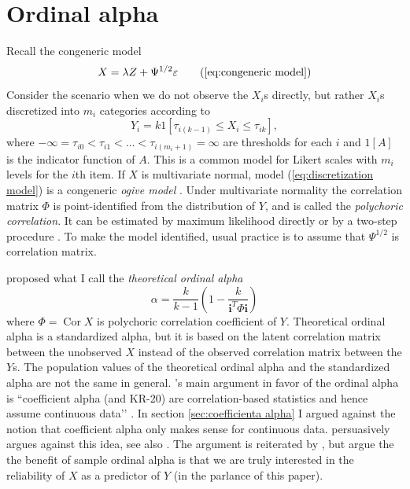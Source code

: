\documentclass[twoside]{article}
\DeclareMathOperator{\Cor}{Cor}
\begin{document}
\section{Ordinal alpha\label{sec:Ordinal alpha}}

Recall the congeneric model
\begin{equation}
X=\lambda Z+\Psi^{1/2}\varepsilon    \tag{\ref{eq:congeneric model}}
\end{equation}
Consider the scenario when we do not observe the $X_{i}$s directly,
but rather $X_{i}$s discretized into $m_{i}$ categories according
to
\begin{equation}
Y_{i}=k1[\tau_{i(k-1)}\leq X_{i}\leq\tau_{ik}],\label{eq:discretization model}
\end{equation}
where $-\infty=\tau_{i0}<\tau_{i1}<\ldots<\tau_{i(m_{i}+1)}=\infty$
are thresholds for each $i$ and $1[A]$ is the indicator function of $A$.
This is a common model for Likert scales with $m_{i}$ levels for
the $i$th item. If $X$ is multivariate normal, model (\ref{eq:discretization model})
is a congeneric \emph{ogive model} \citep{Swaminathan2016-rg}.
Under multivariate normality the correlation matrix $\Phi$ is point-identified
from the distribution of $Y$, and is called the \emph{polychoric
correlation}. It can be estimated by maximum likelihood directly
or by a two-step procedure \citep{Olsson1979-ti}. To make the model
identified, usual practice is to assume that $\Psi^{1/2}$ is correlation
matrix. 

\citet{Zumbo2007-ap} proposed what I call the \emph{theoretical ordinal
alpha}
\begin{equation}
\alpha=\frac{k}{k-1}\left(1-\frac{k}{\mathbf{i}^{T}\Phi\mathbf{i}}\right)\label{eq:ordinal alpha}
\end{equation}
where $\Phi=\Cor X$ is polychoric correlation coefficient of $Y$.
Theoretical ordinal alpha is a standardized alpha, but it is based
on the latent correlation matrix between the unobserved $X$ instead
of the observed correlation matrix between the $Y$s. The population
values of the theoretical ordinal alpha and the standardized alpha
are not the same in general. \citet{Zumbo2007-ap}'s main argument
in favor of the ordinal alpha is ``coefficient alpha (and KR-20)
are correlation-based statistics and hence assume continuous data\textquoteright \textquoteright{}
\citep[p. 27]{Zumbo2007-ap}. In section \ref{sec:coefficienta alpha} I argued against the notion that coefficient alpha only makes sense for continuous data. \citet[p. 1060, "Misconception 1"]{Chalmers2018-fj}
persuasively argues against this idea, see also \citep{Raykov2019-yr}. The argument is reiterated
by \citep{Gadermann2012-jl}, but \citet{Zumbo2019-lm} argue
the the benefit of sample ordinal alpha is that we are truly interested
in the reliability of $X$ as a predictor of $Y$ (in the parlance
of this paper). 
\end{document}
